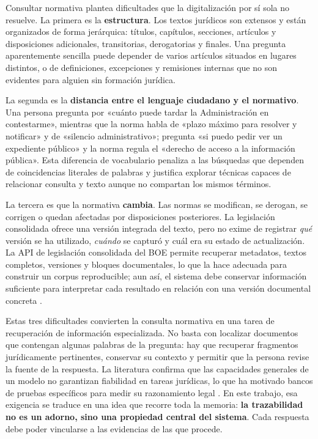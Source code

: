 Consultar normativa plantea dificultades que la digitalización por sí sola no resuelve. La primera es la \textbf{estructura}. Los textos jurídicos son extensos y están organizados de forma jerárquica: títulos, capítulos, secciones, artículos y disposiciones adicionales, transitorias, derogatorias y finales. Una pregunta aparentemente sencilla puede depender de varios artículos situados en lugares distintos, o de definiciones, excepciones y remisiones internas que no son evidentes para alguien sin formación jurídica.
 
La segunda es la \textbf{distancia entre el lenguaje ciudadano y el normativo}. Una persona pregunta por «cuánto puede tardar la Administración en contestarme», mientras que la norma habla de «plazo máximo para resolver y notificar» y de «silencio administrativo»; pregunta «si puedo pedir ver un expediente público» y la norma regula el «derecho de acceso a la información pública». Esta diferencia de vocabulario penaliza a las búsquedas que dependen de coincidencias literales de palabras y justifica explorar técnicas capaces de relacionar consulta y texto aunque no compartan los mismos términos.
 
La tercera es que la normativa \textbf{cambia}. Las normas se modifican, se derogan, se corrigen o quedan afectadas por disposiciones posteriores. La legislación consolidada ofrece una versión integrada del texto, pero no exime de registrar \emph{qué} versión se ha utilizado, \emph{cuándo} se capturó y cuál era su estado de actualización. La API de legislación consolidada del BOE permite recuperar metadatos, textos completos, versiones y bloques documentales, lo que la hace adecuada para construir un corpus reproducible; aun así, el sistema debe conservar información suficiente para interpretar cada resultado en relación con una versión documental concreta \cite{boeApiConsolidada}.
 
Estas tres dificultades convierten la consulta normativa en una tarea de recuperación de información especializada. No basta con localizar documentos que contengan algunas palabras de la pregunta: hay que recuperar fragmentos jurídicamente pertinentes, conservar su contexto y permitir que la persona revise la fuente de la respuesta. La literatura confirma que las capacidades generales de un modelo no garantizan fiabilidad en tareas jurídicas, lo que ha motivado bancos de pruebas específicos para medir su razonamiento legal \cite{guha2023legalbench}. En este trabajo, esa exigencia se traduce en una idea que recorre toda la memoria: \textbf{la trazabilidad no es un adorno, sino una propiedad central del sistema}. Cada respuesta debe poder vincularse a las evidencias de las que procede.
 
